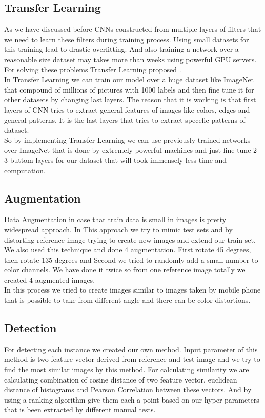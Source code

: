 \documentclass[10pt,twocolumn,letterpaper]{article}
\begin{document}
\subsection{Transfer Learning}
As we have discussed before CNNs constructed from multiple layers of filters that we need to learn these filters during training process. Using small datasets for this training lead to drastic overfitting. And also training a network over a reasonable size dataset may takes more than weeks using powerful GPU servers. For solving these problems Transfer Learning proposed \cite{transfer_learning2} \cite{transfer_learning3}. \\
In Transfer Learning we can train our model over a huge dataset like ImageNet that compound of millions of pictures with 1000 labels and then fine tune it for other datasets by changing last layers. The reason that it is working is that first layers of CNN tries to extract general features of images like colors, edges and general patterns. It is the last layers that tries to extract specefic patterns of dataset. \\
So by implementing Transfer Learning we can use previously trained networks over ImageNet that is done by extremely powerful machines and just fine-tune 2-3 buttom layers for our dataset that will took immensely less time and computation. 

\subsection{Augmentation}
Data Augmentation in case that train data is small in images is pretty widespread approach. \cite{augmented_deep} In This approach we try to mimic test sets and by distorting reference image trying to create new images and extend our train set. \\
We also used this technique and done 4 augmentation. First rotate 45 degrees, then rotate 135 degrees and Second we tried to randomly add a small number to color channels. We have done it twice so from one reference image totally we created 4 augmented images. \\
In this process we tried to create images similar to images taken by mobile phone that is possible to take from different angle and there can be color distortions. 
 
\subsection{Detection}
For detecting each instance we created our own method. Input parameter of this method is two feature vector derived from reference and test image and we try to find the most similar images by this method. For calculating similarity we are calculating combination of cosine distance of two feature vector, euclidean distance of histograms and Pearson Correlation between these vectors. And by using a ranking algorithm give them each a point based on our hyper parameters that is been extracted by different manual tests. 
\end{document}
